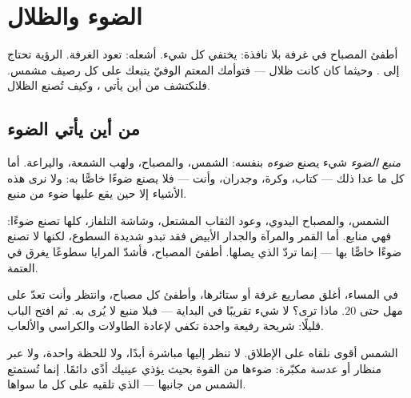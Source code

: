\chapter{الضوء والظلال}\label{ch:g1:light-and-shadows}

أطفئ المصباح في غرفة بلا نافذة: يختفي كل شيء. أشعله: تعود الغرفة.
الرؤية تحتاج إلى . وحيثما كان  كانت ظلال --- فتوأمك المعتم
الوفيّ يتبعك على كل رصيف مشمس. فلنكتشف من أين يأتي ، وكيف
تُصنع الظلال.

\section{من أين يأتي الضوء}

\begin{definition}\label{def:g1:light-and-shadows:source}
\emph{منبع الضوء} شيء يصنع \emph{ضوءه}
بنفسه: الشمس، والمصباح، ولهب الشمعة، واليراعة. أما كل ما عدا ذلك
--- كتاب، وكرة، وجدران، وأنت --- فلا يصنع ضوءًا خاصًّا به: ولا
نرى هذه الأشياء إلا حين يقع عليها ضوء من منبع.
\end{definition}

\begin{example}[منابع أم لا؟]\label{ex:g1:light-and-shadows:sources}
الشمس، والمصباح اليدوي، وعود الثقاب المشتعل، وشاشة التلفاز، كلها
تصنع ضوءًا: فهي منابع. أما القمر والمرآة والجدار الأبيض فقد تبدو
شديدة السطوع، لكنها لا تصنع ضوءًا خاصًّا بها --- إنما تردّ 
الذي يصلها. أطفئ المصباح، فأشدّ المرايا سطوعًا يغرق في العتمة.
\end{example}

\begin{example}\label{ex:g1:light-and-shadows:darkroom}
في المساء، أغلق مصاريع غرفة أو ستائرها، وأطفئ كل مصباح، وانتظر
وأنت تعدّ على مهل حتى $20$. ماذا ترى؟ لا شيء تقريبًا في البداية
--- فبلا منبع لا  يُرى به. ثم افتح الباب قليلًا: شريحة 
رفيعة واحدة تكفي لإعادة الطاولات والكراسي والألعاب.
\end{example}

\begin{remark}\label{rem:g1:light-and-shadows:sun}
الشمس أقوى  نلقاه على الإطلاق. لا تنظر إليها مباشرة أبدًا،
ولا للحظة واحدة، ولا عبر منظار أو عدسة مكبّرة: ضوءها من القوة بحيث
يؤذي عينيك أذًى دائمًا. إنما تُستمتع الشمس من جانبها --- 
الذي تلقيه على كل ما سواها.
\end{remark}

